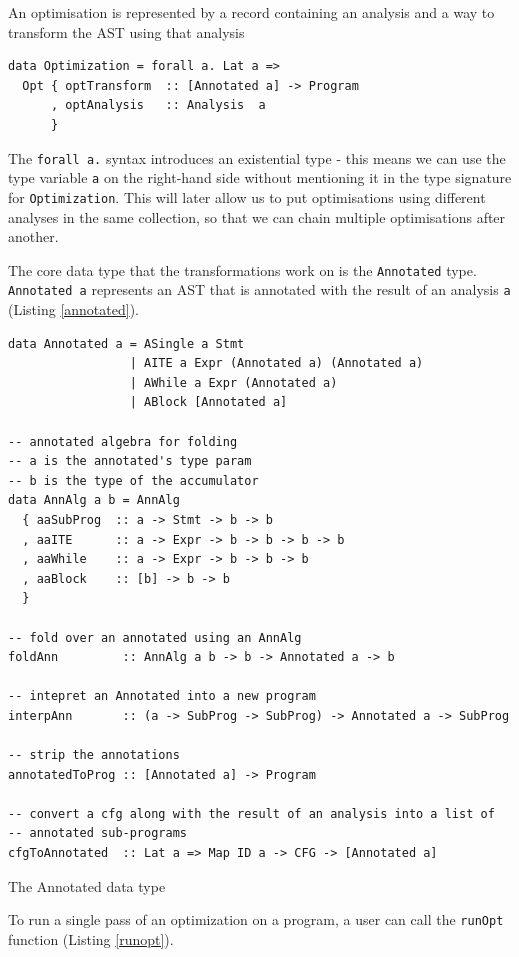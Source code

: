 \documentclass{article}
\begin{document}
An optimisation is represented by a record containing an analysis and a
way to transform the AST using that analysis

\begin{verbatim}
data Optimization = forall a. Lat a =>
  Opt { optTransform  :: [Annotated a] -> Program
      , optAnalysis   :: Analysis  a
      }
\end{verbatim}

The \texttt{forall a.} syntax introduces an existential type - this
means we can use the type variable \texttt{a} on the right-hand side
without mentioning it in the type signature for \texttt{Optimization}.
This will later allow us to put optimisations using different analyses
in the same collection, so that we can chain multiple optimisations after
another.

The core data type that the transformations work on is the
\texttt{Annotated} type. \texttt{Annotated a} represents an AST that is
annotated with the result of an analysis \texttt{a} (Listing \ref{annotated}).

\begin{listing}[H]
\begin{verbatim}
data Annotated a = ASingle a Stmt
                 | AITE a Expr (Annotated a) (Annotated a)
                 | AWhile a Expr (Annotated a)
                 | ABlock [Annotated a]

-- annotated algebra for folding
-- a is the annotated's type param
-- b is the type of the accumulator
data AnnAlg a b = AnnAlg
  { aaSubProg  :: a -> Stmt -> b -> b
  , aaITE      :: a -> Expr -> b -> b -> b -> b
  , aaWhile    :: a -> Expr -> b -> b -> b
  , aaBlock    :: [b] -> b -> b
  }

-- fold over an annotated using an AnnAlg
foldAnn         :: AnnAlg a b -> b -> Annotated a -> b

-- intepret an Annotated into a new program
interpAnn       :: (a -> SubProg -> SubProg) -> Annotated a -> SubProg

-- strip the annotations
annotatedToProg :: [Annotated a] -> Program

-- convert a cfg along with the result of an analysis into a list of
-- annotated sub-programs
cfgToAnnotated  :: Lat a => Map ID a -> CFG -> [Annotated a]
\end{verbatim}
\caption{The Annotated data type}
\label{annotated}
\end{listing}

To run a single pass of an optimization on a program, a user can call
the \texttt{runOpt} function (Listing \ref{runopt}).
\end{document}
